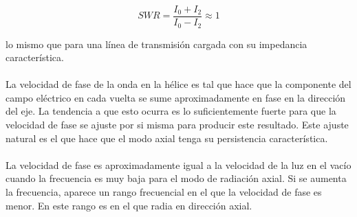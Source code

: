 \documentclass[12pt]{article}
\begin{document}
\begin{equation*}
	SWR=\frac{I_{0}+I_{2}}{I_{0}-I_{2}}\approx 1
\end{equation*}

lo mismo que para una línea de transmisión cargada con su impedancia característica.\\\\
La velocidad de fase de la onda en la hélice es tal que hace que la componente del campo eléctrico en cada vuelta se sume aproximadamente en fase en la dirección del eje. La tendencia a que esto ocurra es lo suficientemente fuerte para que la velocidad de fase se ajuste por si misma para producir este resultado. Este ajuste natural es el que hace que el modo axial tenga su persistencia característica.\\\\
La velocidad de fase es aproximadamente igual a la velocidad de la luz en el vacío cuando la frecuencia es muy baja para el modo de radiación axial. Si se aumenta la frecuencia, aparece un rango frecuencial en el que la velocidad de fase es menor. En este rango es en el que radia en  dirección axial.




\newpage


\newpage

\printglossary[type=\acronymtype]

\newpage
\printglossary[type=main]
\end{document}
